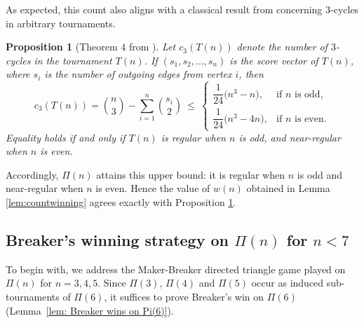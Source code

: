 \documentclass{article}
\theoremstyle{definition}
\theoremstyle{plain}
\newtheorem{prop}[theo]{Proposition}
\theoremstyle{remark}
\theoremstyle{definition}
\begin{document}
As expected, this count also aligns with a classical result from \cite{moon2015topics} concerning $3$-cycles in arbitrary tournaments.
\begin{prop} [Theorem $4$ from \cite{moon2015topics}] \label{theo: moon's count}
    Let $c_3(T(n))$ denote the number of $3$-cycles in the tournament $T(n)$.
    If $(s_1,s_2,\ldots,s_n)$ is the score vector of $T(n)$, where $s_i$ is the number of outgoing edges from vertex $i$, then
    \[
    c_3(T(n))
    = \binom{n}{3}
      - \sum_{i=1}^{n} \binom{s_i}{2}
    \ \le\ 
    \begin{cases}
    \dfrac{1}{24}\bigl(n^{3}-n\bigr), & \text{if $n$ is odd},\\[6pt]
    \dfrac{1}{24}\bigl(n^{3}-4n\bigr), & \text{if $n$ is even}.
    \end{cases}
    \]
    Equality holds if and only if $T(n)$ is regular when $n$ is odd, and near-regular when $n$ is even.
\end{prop}

Accordingly, $\Pi(n)$ attains this upper bound: it is regular when $n$ is odd and near-regular when $n$ is even. Hence the value of $w(n)$ obtained in Lemma \ref{lem:countwinning} agrees exactly with Proposition \ref{theo: moon's count}.

\subsection{\texorpdfstring{Breaker's winning strategy on $\Pi(n)$ for $n < 7$}{Breaker's winning strategy on Pi(n) for n < 7}}

To begin with, we address the Maker-Breaker directed triangle game played on $\Pi(n)$ for $n=3,4,5$. Since $\Pi(3)$, $\Pi(4)$ and $\Pi(5)$ occur as induced sub-tournaments of $\Pi(6)$, it suffices to prove Breaker's win on $\Pi(6)$ (Lemma~\ref{lem: Breaker wins on Pi(6)}).
\end{document}
